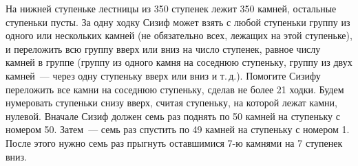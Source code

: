\problem
На нижней ступеньке лестницы из 350 ступенек лежит 350 камней, остальные
ступеньки пусты.
За одну ходку Сизиф может взять с любой ступеньки группу из одного или
нескольких камней (не обязательно всех, лежащих на этой ступеньке), и
переложить всю группу вверх или вниз на число ступенек, равное числу камней в
группе (группу из одного камня на соседнюю ступеньку, группу из двух камней~---
через одну ступеньку вверх или вниз и т.\,д.).
Помогите Сизифу переложить все камни на соседнюю ступеньку, сделав не более
21 ходки.
\solution
Будем нумеровать ступеньки снизу вверх, считая ступеньку, на которой лежат
камни, нулевой.
Вначале Сизиф должен семь раз поднять по 50 камней на ступеньку с номером 50.
Затем~--- семь раз спустить по 49 камней на ступеньку с номером 1.
После этого нужно семь раз прыгнуть оставшимися 7-ю камнями на 7 ступенек вниз.
\endproblem
